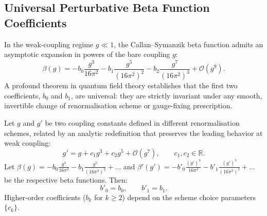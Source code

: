 \subsection{Universal Perturbative Beta Function Coefficients}
\label{subsec:universal_beta_coeffs}

In the weak-coupling regime $g \ll 1$, the Callan--Symanzik beta function admits an asymptotic expansion in powers of the bare coupling $g$:
\begin{equation}
\label{eq:beta_expansion}
\beta(g) = -b_0 \frac{g^3}{16\pi^2} - b_1 \frac{g^5}{(16\pi^2)^2} - b_2 \frac{g^7}{(16\pi^2)^3} + \mathcal{O}(g^9).
\end{equation}
A profound theorem in quantum field theory establishes that the first two coefficients, $b_0$ and $b_1$, are universal: they are strictly invariant under any smooth, invertible change of renormalisation scheme or gauge-fixing prescription.

\begin{proposition}
\label{prop:scheme_invariance}
Let $g$ and $g'$ be two coupling constants defined in different renormalisation schemes, related by an analytic redefinition that preserves the leading behavior at weak coupling:
\begin{equation}
\label{eq:scheme_redefinition}
g' = g + c_1 g^3 + c_2 g^5 + \mathcal{O}(g^7), \qquad c_1, c_2 \in \mathbb{R}.
\end{equation}
Let $\beta(g) = -b_0 \frac{g^3}{16\pi^2} - b_1 \frac{g^5}{(16\pi^2)^2} + \dots$ and $\beta'(g') = -b'_0 \frac{(g')^3}{16\pi^2} - b'_1 \frac{(g')^5}{(16\pi^2)^2} + \dots$ be the respective beta functions. Then:
\begin{equation}
b'_0 = b_0, \qquad b'_1 = b_1.
\end{equation}
Higher-order coefficients ($b_k$ for $k \ge 2$) depend on the scheme choice parameters $\{c_k\}$.
\end{proposition}

